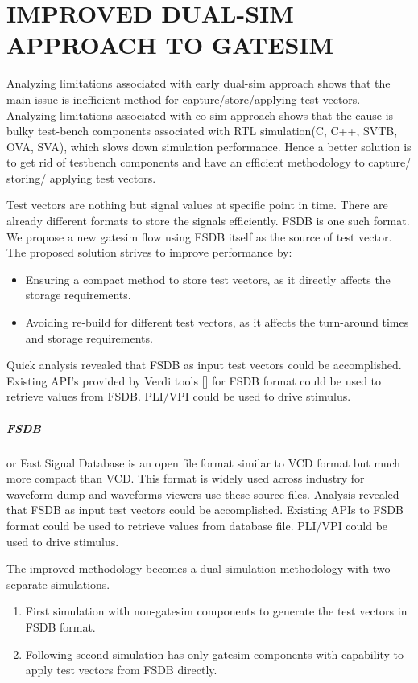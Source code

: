 \chapter{IMPROVED DUAL-SIM APPROACH TO GATESIM}
\label{chap:dualsim.tex}
Analyzing limitations associated with early dual-sim approach shows that the main issue is inefficient method for capture/store/applying test vectors. Analyzing limitations associated with co-sim approach shows that the cause is bulky test-bench components associated with RTL simulation(C, C++, SVTB, OVA, SVA), which slows down simulation performance. Hence a better solution is to get rid of testbench components and have an efficient methodology to capture/ storing/ applying test vectors. 

Test vectors are nothing but signal values at specific point in time. There are already different formats to store the signals efficiently. FSDB is one such format. We propose a new gatesim flow using FSDB itself as the source of test vector. The proposed solution strives to improve performance by:

\begin{itemize}
	\item Ensuring a compact method to store test vectors, as it directly affects the storage requirements.
	\item Avoiding re-build for different test vectors, as it affects the turn-around times and storage requirements.
\end{itemize}

Quick analysis revealed that FSDB as input test vectors could be accomplished. Existing API's provided by Verdi tools [] for FSDB format could be used to retrieve values from FSDB. PLI$/$VPI could be used to drive stimulus.

\paragraph{FSDB}or Fast Signal Database is an open file format similar to VCD format but much more compact than VCD. This format is widely used across industry for waveform dump and waveforms viewers use these source files.
Analysis revealed that FSDB as input test vectors could be accomplished. Existing APIs to FSDB format could be used to retrieve values from database file. PLI/VPI could be used to drive stimulus.



The improved methodology becomes a dual-simulation methodology with two separate simulations.
\begin{enumerate}
	\item First simulation with non-gatesim components to generate the test vectors in FSDB format.
	\item Following second simulation has only gatesim components with capability to apply test vectors from FSDB directly.
\end{enumerate}






